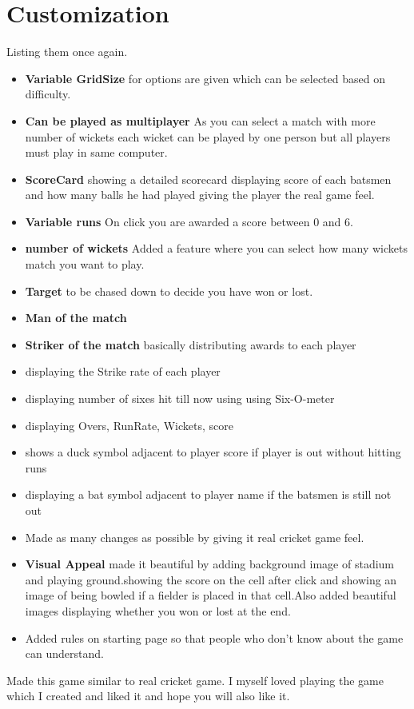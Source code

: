\documentclass{article}
\begin{document}
\section{Customization}
Listing them once again.
\begin{itemize}
    \item \textbf{Variable GridSize} for options are given which can be selected based on difficulty.
    \item \textbf{Can be played as multiplayer}
    As you can select a match with more number of wickets each wicket can be played by one person but all players must play in same computer.
    \item \textbf{ScoreCard} showing a detailed scorecard displaying score of each batsmen and how many balls he had played giving the player the real game feel.
    \item \textbf{Variable runs} On click you are awarded a score between 0 and 6.
    \item \textbf{number of wickets} Added a feature where you can select how many wickets match you want to play.
    \item \textbf{Target} to be chased down to decide you have won or lost.
    \item \textbf{Man of the match}
    \item \textbf{Striker of the match} basically distributing awards to each player
    \item displaying the Strike rate of each player
    \item displaying number of sixes hit till now using using Six-O-meter
    \item displaying Overs, RunRate, Wickets, score
    \item shows a duck symbol adjacent to player score if player is out without hitting runs 
    \item displaying a bat symbol adjacent to player name if the batsmen is still not out
    \item Made as many changes as possible by giving it real cricket game feel.
    \item \textbf{Visual Appeal} made it beautiful by adding background image of stadium and playing ground.showing the score on the cell after click and showing an image of being bowled if a fielder is placed in that cell.Also added beautiful images displaying whether you won or lost at the end.
    \item Added rules on starting page so that people who don't know about the game can understand.
\end{itemize}
Made this game similar to real cricket game. I myself loved playing the game which I created and liked it and hope you will also like it.
\end{document}
